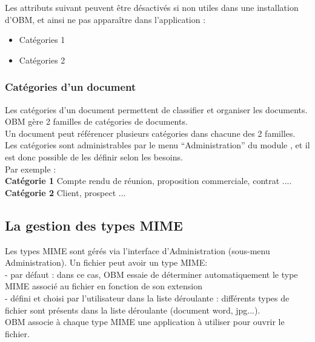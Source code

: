 Les attributs suivant peuvent être désactivés si non utiles dans une installation d'OBM, et ainsi ne pas apparaître dans l'application :

\begin{itemize}
\item Catégories 1
\item Catégories 2
\end{itemize}


\subsubsection{Catégories d'un document}
Les catégories d'un document permettent de classifier et organiser les documents.\\

OBM gère 2 familles de catégories de documents.\\

Un document peut référencer plusieurs catégories dans chacune des 2 familles.\\

Les catégories sont administrables par le menu ``Administration'' du module \doc, et il est donc possible de les définir selon les besoins.\\

Par exemple :\\ 
\textbf{Catégorie 1} Compte rendu de réunion, proposition commerciale, contrat ....\\
\textbf{Catégorie 2} Client, prospect ...\\


\subsection{La gestion des types MIME}

Les types MIME sont gérés via l'interface d'Administration (sous-menu Administration). Un fichier peut avoir un type MIME:\\
- par défaut : dans ce cas, OBM essaie de déterminer automatiquement le type MIME associé au fichier en fonction de son extension\\
- défini et choisi par l'utilisateur dans la liste déroulante : différents types de fichier sont présents dans la liste déroulante (document word, jpg...).\\

OBM associe à chaque type MIME une application à utiliser pour ouvrir le fichier.\\

